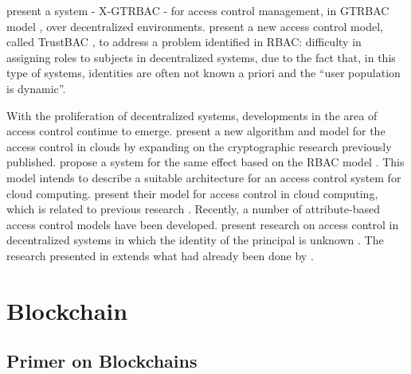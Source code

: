 \citeauthor{bhatti_x-gtrbac_2004} \cite{bhatti_x-gtrbac_2004} present a system - X-GTRBAC - for access control management, in GTRBAC model \cite{joshi_generalized_2005}, over decentralized environments. \citeauthor{chakraborty_trustbac:_2006} \cite{chakraborty_trustbac:_2006} present a new access control model, called TrustBAC \cite{chakraborty_trustbac:_2006}, to address a problem identified in RBAC: difficulty in assigning roles to subjects in decentralized systems, due to the fact that, in this type of systems, identities are often not known a priori and the “user population is dynamic”.

With the proliferation of decentralized systems, developments in the area of access control continue
to emerge. \citeauthor{ruj_dacc:_2011} \cite{ruj_dacc:_2011} present a new algorithm and model for the access control \cite{ruj_dacc:_2011} in clouds by expanding on the cryptographic research previously published. \citeauthor{calero_toward_2010} \cite{calero_toward_2010} propose a system for the same effect based on the RBAC model \cite{calero_toward_2010}. This model intends to describe a suitable architecture for an access control system for cloud computing. \citeauthor{yu_achieving_2010} \cite{yu_achieving_2010} present their model for access control in cloud computing, which is related to previous research \cite{calero_toward_2010}. Recently, a number of attribute-based access control models have been developed. \citeauthor{ruj_decentralized_2014} \cite{ruj_decentralized_2014} present research on access control in decentralized systems in which the identity of the principal is unknown \cite{ruj_decentralized_2014}. The research presented in \cite{ruj_decentralized_2014} extends what had already been done by \citeauthor{ruj_privacy_2012} \cite{ruj_privacy_2012}.

\section{Blockchain}
\label{sec:related-blockchain}

\subsection{Primer on Blockchains}


